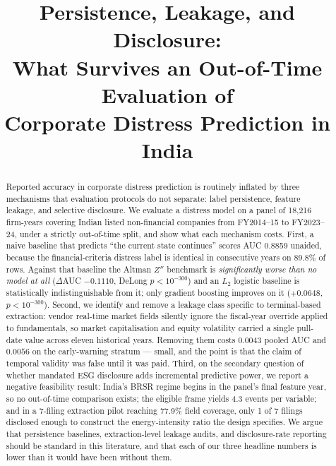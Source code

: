 \documentclass[conference]{IEEEtran}
\begin{document}
\title{Persistence, Leakage, and Disclosure:\\
What Survives an Out-of-Time Evaluation of\\
Corporate Distress Prediction in India}

\author{
}

\maketitle

\begin{abstract}
Reported accuracy in corporate distress prediction is routinely inflated by
three mechanisms that evaluation protocols do not separate: label persistence,
feature leakage, and selective disclosure. We evaluate a distress model on a
panel of 18,216 firm-years covering Indian listed non-financial
companies from FY2014--15 to FY2023--24, under a strictly out-of-time split,
and show what each mechanism costs. First, a naive baseline that predicts
``the current state continues'' scores AUC 0.8859 unaided, because the
financial-criteria distress label is identical in consecutive years on 89.8\%
of rows. Against that baseline the Altman $Z''$ benchmark is
\emph{significantly worse than no model at all} ($\Delta$AUC $-0.1110$,
DeLong $p<10^{-300}$) and an $L_2$ logistic baseline is statistically
indistinguishable from it; only gradient boosting improves on it
($+0.0648$, $p<10^{-300}$). Second, we identify and remove a leakage class
specific to terminal-based extraction: vendor real-time market fields silently
ignore the fiscal-year override applied to fundamentals, so market
capitalisation and equity volatility carried a single pull-date value across
eleven historical years. Removing them costs $0.0043$ pooled AUC and $0.0056$
on the early-warning stratum --- small, and the point is that the claim of
temporal validity was false until it was paid. Third, on the secondary
question of whether mandated ESG disclosure adds incremental predictive power,
we report a negative feasibility result: India's BRSR regime begins in the
panel's final feature year, so no out-of-time comparison exists; the eligible
frame yields 4.3 events per variable; and in a 7-filing extraction pilot
reaching 77.9\% field coverage, only 1 of 7 filings disclosed enough to
construct the energy-intensity ratio the design specifies. We argue that
persistence baselines, extraction-level leakage audits, and disclosure-rate
reporting should be standard in this literature, and that each of our three
headline numbers is lower than it would have been without them.
\end{abstract}
\end{document}
